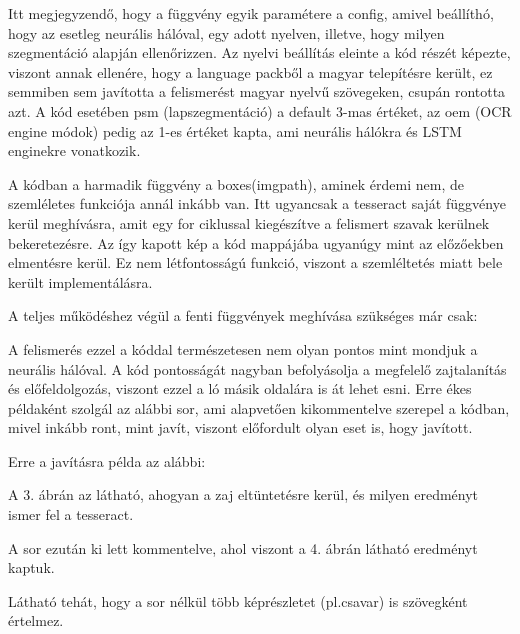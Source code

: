 \documentclass[hidelinks,12pt,a4paper]{report}
\begin{document}

Itt megjegyzendő, hogy a függvény egyik paramétere a config, amivel beállíthó, hogy az esetleg neurális hálóval, egy adott nyelven, illetve, hogy milyen szegmentáció alapján ellenőrizzen. Az nyelvi beállítás eleinte a kód részét képezte, viszont annak ellenére, hogy a language packből a magyar telepítésre került, ez semmiben sem javította a felismerést magyar nyelvű szövegeken, csupán rontotta azt. A kód esetében psm (lapszegmentáció) a default 3-mas értéket, az oem (OCR engine módok) pedig az 1-es értéket kapta, ami neurális hálókra és LSTM enginekre vonatkozik.

A kódban a harmadik függvény a boxes(imgpath), aminek érdemi nem, de szemléletes funkciója annál inkább van. Itt ugyancsak a tesseract saját függvénye kerül meghívásra, amit egy for ciklussal kiegészítve a felismert szavak kerülnek bekeretezésre.
Az így kapott kép a kód mappájába ugyanúgy mint az előzőekben elmentésre kerül. Ez nem létfontosságú funkció, viszont a szemléltetés miatt bele került implementálásra.


A teljes működéshez végül a fenti függvények meghívása szükséges már csak:




A felismerés ezzel a kóddal természetesen nem olyan pontos mint mondjuk a neurális hálóval. A kód pontosságát nagyban befolyásolja a megfelelő zajtalanítás és előfeldolgozás, viszont ezzel a ló másik oldalára is át lehet esni. 
Erre ékes példaként szolgál az alábbi sor, ami alapvetően kikommentelve szerepel a kódban, mivel inkább ront, mint javít, viszont előfordult olyan eset is, hogy javított.


Erre a javításra példa az alábbi:


A 3. ábrán az látható, ahogyan a zaj eltüntetésre kerül, és milyen eredményt ismer fel a tesseract.

A sor ezután ki lett kommentelve, ahol viszont a 4. ábrán látható eredményt kaptuk.


Látható tehát, hogy a sor nélkül több képrészletet (pl.csavar) is szövegként értelmez.
\end{document}
